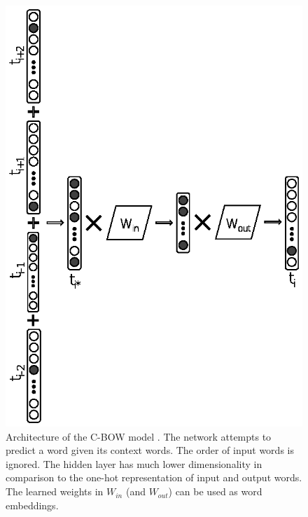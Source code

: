 
\begin{figure}[t]
	\begin{center}
    	\includegraphics[scale=0.99]{Figures/CBOW_diagram.eps}
		\caption{Architecture of the C-BOW model . The network attempts to predict a word given its context words. The order of input words is ignored. The hidden layer has much lower dimensionality in comparison to the one-hot representation of input and output words. The learned weights in $W_{in}$ (and $W_{out}$) can be used as word embeddings.}
		\label{chap:word_embeddingss:fig:CBOW_diagram}
	\end{center}
\end{figure}

